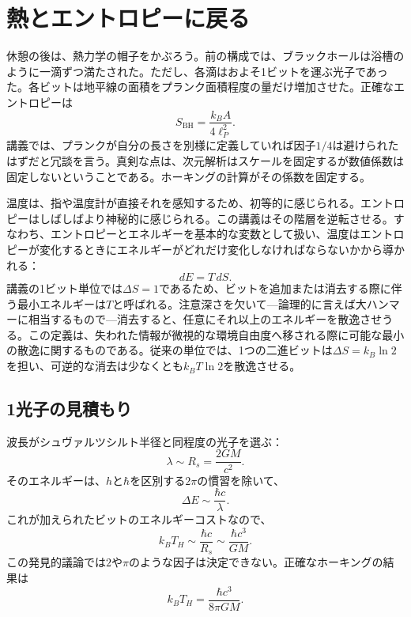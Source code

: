 \section{熱とエントロピーに戻る}

休憩の後は、熱力学の帽子をかぶろう。前の構成では、ブラックホールは浴槽のように一滴ずつ満たされた。ただし、各滴はおよそ1ビットを運ぶ光子であった。各ビットは地平線の面積をプランク面積程度の量だけ増加させた。正確なエントロピーは
\begin{equation}
S_{\mathrm{BH}}=\frac{k_B A}{4\ell_P^2}.
\end{equation}
講義では、プランクが自分の長さを別様に定義していれば因子\(1/4\)は避けられたはずだと冗談を言う。真剣な点は、次元解析はスケールを固定するが数値係数は固定しないということである。ホーキングの計算がその係数を固定する。

温度は、指や温度計が直接それを感知するため、初等的に感じられる。エントロピーはしばしばより神秘的に感じられる。この講義はその階層を逆転させる。すなわち、エントロピーとエネルギーを基本的な変数として扱い、温度はエントロピーが変化するときにエネルギーがどれだけ変化しなければならないかから導かれる：
\begin{equation}
dE=T\,dS.
\end{equation}
講義の1ビット単位では\(\Delta S=1\)であるため、ビットを追加または消去する際に伴う最小エネルギーは\(T\)と呼ばれる。注意深さを欠いて---論理的に言えば大ハンマーに相当するもので---消去すると、任意にそれ以上のエネルギーを散逸させうる。この定義は、失われた情報が微視的な環境自由度へ移される際に可能な最小の散逸に関するものである。従来の単位では、1つの二進ビットは\(\Delta S=k_B\ln2\)を担い、可逆的な消去は少なくとも\(k_BT\ln2\)を散逸させる。

\subsection{1光子の見積もり}

波長がシュヴァルツシルト半径と同程度の光子を選ぶ：
\begin{equation}
\lambda\sim R_s=\frac{2GM}{c^2}.
\end{equation}
そのエネルギーは、\(h\)と\(\hbar\)を区別する\(2\pi\)の慣習を除いて、
\begin{equation}
\Delta E\sim \frac{\hbar c}{\lambda}.
\end{equation}
これが加えられたビットのエネルギーコストなので、
\begin{equation}
k_BT_H\sim\frac{\hbar c}{R_s}
\sim\frac{\hbar c^3}{GM}.
\label{eq:l03-hawking-scale}
\end{equation}
この発見的議論では\(2\)や\(\pi\)のような因子は決定できない。正確なホーキングの結果は
\begin{equation}
\boxed{k_BT_H=\frac{\hbar c^3}{8\pi GM}.}
\label{eq:l03-hawking-exact}
\end{equation}

